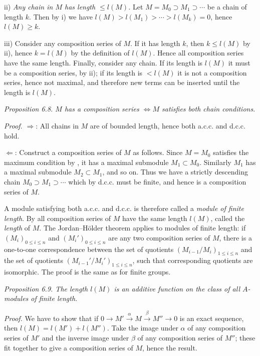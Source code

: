 ii) \textit{Any chain in $M$ has length $\leq l(M)$.} Let $M=M_0\supset M_1\supset\cdots$ be a chain of length $k$. Then by i) we have $l(M)>l(M_1)>\cdots>l(M_k)=0$, hence $l(M)\geq k$.

iii) Consider any composition series of $M$. If it has length $k$, then $k\leq l(M)$ by ii), hence $k=l(M)$ by the definition of $l(M)$. Hence all composition series have the same length. Finally, consider any chain. If its length is $l(M)$ it must be a composition series, by ii); if its length is $<l(M)$ it is not a composition series, hence not maximal, and therefore new terms can be inserted until the length is $l(M)$. \proofbox

\noindent\textit{Proposition 6.8. $M$ has a composition series $\Longleftrightarrow M$ satisfies both chain conditions.}

\noindent\textit{Proof.} $\Rightarrow$: All chains in $M$ are of bounded length, hence both a.c.c. and d.c.c. hold.

$\Leftarrow$: Construct a composition series of $M$ as follows. Since $M=M_0$ satisfies the maximum condition by , it has a maximal submodule $M_1\subset M_0$. Similarly $M_1$ has a maximal submodule $M_2\subset M_1$, and so on. Thus we have a strictly descending chain $M_0\supset M_1\supset\cdots$ which by d.c.c. must be finite, and hence is a composition series of $M$. \proofbox

A module satisfying both a.c.c. and d.c.c. is therefore called a \textit{module of finite length}. By  all composition series of $M$ have the same length $l(M)$, called the \textit{length} of $M$. The Jordan--Hölder theorem applies to modules of finite length: if $(M_i)_{0\leq i\leq n}$ and $(M_i')_{0\leq i\leq n}$ are any two composition series of $M$, there is a one-to-one correspondence between the set of quotients $(M_{i-1}/M_i)_{1\leq i\leq n}$ and the set of quotients $(M_{i-1}'/M_i')_{1\leq i\leq n}$, such that corresponding quotients are isomorphic. The proof is the same as for finite groups.

\noindent\textit{Proposition 6.9. The length $l(M)$ is an additive function on the class of all $A$-modules of finite length.}

\noindent\textit{Proof.} We have to show that if $0\longrightarrow M'\xrightarrow{\alpha}M\xrightarrow{\beta}M''\longrightarrow0$ is an exact sequence, then $l(M)=l(M')+l(M'')$. Take the image under $\alpha$ of any composition series of $M'$ and the inverse image under $\beta$ of any composition series of $M''$; these fit together to give a composition series of $M$, hence the result. \proofbox

